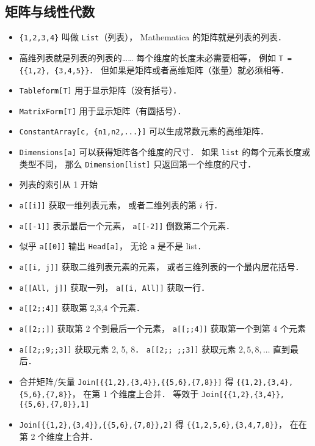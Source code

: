 \subsection{矩阵与线性代数}
\begin{itemize}
\item \verb|{1,2,3,4}| 叫做 \verb|List|（列表）， Mathematica 的矩阵就是列表的列表．
\item 高维列表就是列表的列表的…… 每个维度的长度未必需要相等， 例如 \verb|T = {{1,2}, {3,4,5}}|． 但如果是矩阵或者高维矩阵（张量）就必须相等．
\item \verb|Tableform[T]| 用于显示矩阵（没有括号）．
\item \verb|MatrixForm[T]| 用于显示矩阵（有圆括号）．
\item \verb|ConstantArray[c, {n1,n2,...}]| 可以生成常数元素的高维矩阵．
\item \verb|Dimensions[a]| 可以获得矩阵各个维度的尺寸． 如果 \verb|list| 的每个元素长度或类型不同， 那么 \verb|Dimension[list]| 只返回第一个维度的尺寸．
\item 列表的索引从 1 开始
\item \verb|a[[i]]| 获取一维列表元素， 或者二维列表的第 $i$ 行．
\item \verb|a[[-1]]| 表示最后一个元素， \verb|a[[-2]]| 倒数第二个元素．
\item 似乎 \verb|a[[0]]| 输出 \verb|Head[a]|， 无论 \verb|a| 是不是 list．
\item \verb|a[[i, j]]| 获取二维列表元素的元素， 或者三维列表的一个最内层花括号．
\item \verb|a[[All, j]]| 获取一列， \verb|a[[i, All]]| 获取一行．
\item \verb|a[[2;;4]]| 获取第 2,3,4 个元素．
\item \verb|a[[2;;]]| 获取第 2 个到最后一个元素， \verb|a[[;;4]]| 获取第一个到第 4 个元素
\item \verb|a[[2;;9;;3]]| 获取元素 2, 5, 8． \verb|a[[2;; ;;3]]| 获取元素 $2, 5, 8, \dots$ 直到最后．
\item 合并矩阵/矢量 \verb|Join[{{1,2},{3,4}},{{5,6},{7,8}}]| 得 \verb|{{1,2},{3,4},{5,6},{7,8}}|， 在第 1 个维度上合并． 等效于 \verb|Join[{{1,2},{3,4}},{{5,6},{7,8}},1]|
\item \verb|Join[{{1,2},{3,4}},{{5,6},{7,8}},2]| 得 \verb|{{1,2,5,6},{3,4,7,8}}|， 在在第 2 个维度上合并．
\end{itemize}


